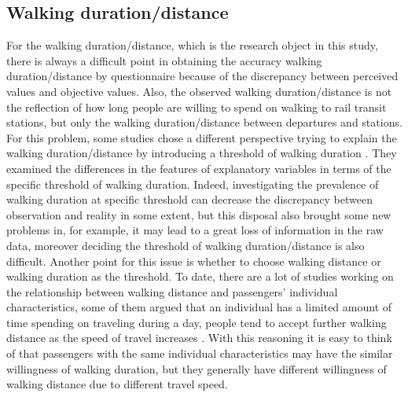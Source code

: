\documentclass[Journal,letterpaper]{ascelike-new}
\begin{document}
\subsection{Walking duration/distance}
%
For the walking duration/distance, which is the research object in this study, there is always a difficult point in obtaining the accuracy walking duration/distance by questionnaire because of the discrepancy between perceived values and objective values. Also, the observed walking duration/distance is not the reflection of how long people are willing to spend on walking to rail transit stations, but only the walking duration/distance between departures and stations. For this problem, some studies chose a different perspective trying to explain the walking duration/distance by introducing a threshold of walking duration \cite{besser2005walking,mccormack2008objective}. They examined the differences in the features of explanatory variables in terms of the specific threshold of walking duration. Indeed, investigating the prevalence of walking duration at specific threshold can decrease the discrepancy between observation and reality in some extent, but this disposal also brought some new problems in, for example, it may lead to a great loss of information in the raw data, moreover deciding the threshold of walking duration/distance is also difficult. Another point for this issue is whether to choose walking distance or walking duration as the threshold. To date, there are a lot of studies working on the relationship between walking distance and passengers' individual characteristics, some of them argued that an individual has a limited amount of time spending on traveling during a day, people tend to accept further walking distance as the speed of travel increases \cite{marchetti1994anthropological,larsen2010beyond}. With this reasoning it is easy to think of that passengers with the same individual characteristics may have the similar willingness of walking duration, but they generally have different willingness of walking distance due to different travel speed. 

%
\end{document}
